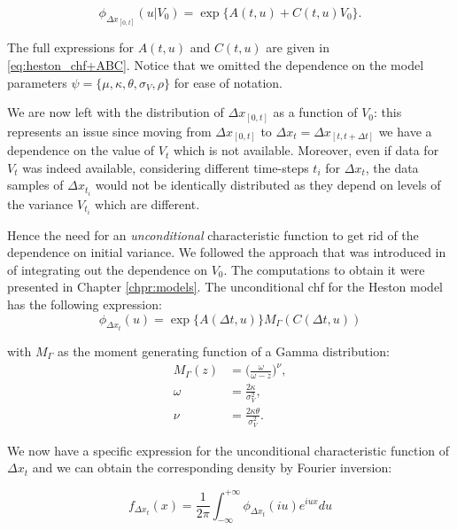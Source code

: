 \begin{equation}
\phi_{\Delta x_{[0, t] }}(u|V_0) =  \exp\{A(t,u) + C(t,u) V_0\}.
\end{equation}

The full expressions for $A(t,u)$ and $C(t,u)$ are given in \eqref{eq:heston_chf+ABC}.
Notice that we omitted the dependence on the model parameters $\psi = \{\mu, \kappa, \theta, \sigma_V, \rho \}$ for ease of notation.

\bigskip
We are now left with the distribution of $\Delta x_{[0, t] }$ as a function of $V_0$: this represents an issue since moving from $\Delta x_{[0, t] }$ to $\Delta x_t  = \Delta x_{[t, t + \Delta t]}$ we have a dependence on the value of $V_t$ which is not available. Moreover, even if data for $V_t$ was indeed available, considering different time-steps $t_i$ for $\Delta x_{t}$, the data samples of $\Delta x_{t_i}$ would not be identically distributed as they depend on levels of the variance $V_{t_i}$ which are different.

Hence the need for an \textit{unconditional} characteristic function to get rid of the dependence on initial variance. We followed the approach that was introduced in \citep{DRAGULESCU2002} of integrating out the dependence on $V_0$. The computations to obtain it were presented in Chapter \ref{chpr:models}.
The unconditional chf for the Heston model has the following expression:
\begin{equation}
 \phi_{\Delta x_t}(u) = \exp\{A(\Delta t,u) \} M_{\Gamma}(C(\Delta t,u))
\end{equation}


with $M_{\Gamma}$ as the moment generating function of a Gamma distribution:
\begin{subequations}
\begin{align}
	M_{\Gamma} (z) &= \Big(\frac{\omega}{\omega-z}\Big)^\nu, \nonumber \\
	\omega&= \frac{2\kappa}{\sigma_V^2} ,\nonumber\\
	\nu&= \frac{2\kappa\theta}{\sigma_V^2}.\nonumber
\end{align}
\end{subequations}

We now have a specific expression for the unconditional characteristic function of $\Delta x_t$ and we can obtain the corresponding density by Fourier inversion:

\begin{equation}
\label{eq:uncond_inversion}
f_{\Delta x_t}(x) = \frac{1}{2\pi}\int_{-\infty}^{+\infty}  \phi_{\Delta x_t}(i u) e^{i u x} du
\end{equation}


